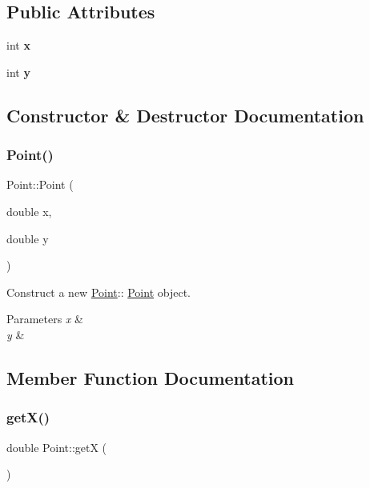 \subsection*{Public Attributes}
\begin{DoxyCompactItemize}
\item 
\mbox{\label{classPoint_a8c779e11e694b20e0946105a9f5de842}} 
int {\bfseries x}
\item 
\mbox{\label{classPoint_a2e1b5fb2b2a83571f5c0bc0f66a73cf7}} 
int {\bfseries y}
\end{DoxyCompactItemize}


\subsection{Constructor \& Destructor Documentation}
\mbox{\label{classPoint_a78b55e8d5466bb8c2cf60fa55f2562ff}} 
\subsubsection{\texorpdfstring{Point()}{Point()}}
{\footnotesize\ttfamily Point\+::\+Point (\begin{DoxyParamCaption}\item[{double}]{x,  }\item[{double}]{y }\end{DoxyParamCaption})}



Construct a new \hyperlink{classPoint}{Point}\+:\+: \hyperlink{classPoint}{Point} object. 


\begin{DoxyParams}{Parameters}
{\em x} & \\
\hline
{\em y} & \\
\hline
\end{DoxyParams}


\subsection{Member Function Documentation}
\mbox{\label{classPoint_a8de35a6098cdd7267b4167776da83da6}} 
\subsubsection{\texorpdfstring{get\+X()}{getX()}}
{\footnotesize\ttfamily double Point\+::getX (\begin{DoxyParamCaption}{ }\end{DoxyParamCaption})}



